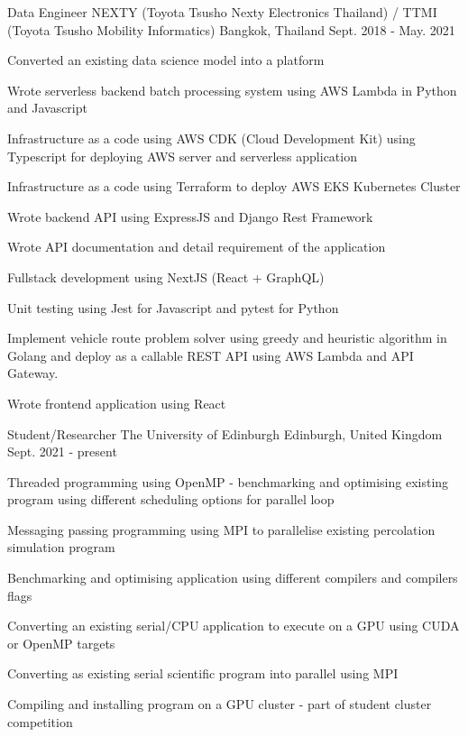\begin{cventries}
  \cventry
    {Data Engineer} %
    {NEXTY (Toyota Tsusho Nexty Electronics Thailand) / TTMI (Toyota Tsusho Mobility Informatics)} %
    {Bangkok, Thailand} %
    {Sept. 2018 - May. 2021} %
    {
      \begin{cvitems} %
        \item {Converted an existing data science model into a platform}
        \item {Wrote serverless backend batch processing system using AWS Lambda in Python and Javascript}
        \item {
          Infrastructure as a code using AWS CDK (Cloud Development Kit) using
          Typescript for deploying AWS server and serverless application
        }
        \item {
          Infrastructure as a code using Terraform to deploy AWS EKS Kubernetes Cluster 
        }
        \item {Wrote backend API using ExpressJS and Django Rest Framework}
        \item {Wrote API documentation and detail requirement of the application}
        \item {Fullstack development using NextJS (React + GraphQL)}
        \item {Unit testing using Jest for Javascript and pytest for Python}
        \item Implement vehicle route problem solver using greedy and heuristic algorithm in Golang and deploy as a callable REST API using AWS Lambda and API Gateway. 
        \item {Wrote frontend application using React}
      \end{cvitems}
    }
  \cventry
  {Student/Researcher} %
  {The University of Edinburgh} %
  {Edinburgh, United Kingdom} %
  {Sept. 2021 - present} %
  {
    \begin{cvitems} %
      \item {Threaded programming using OpenMP - benchmarking and optimising existing program using different scheduling options for parallel loop}
      \item {Messaging passing programming using MPI to parallelise existing percolation simulation program}
      \item {Benchmarking and optimising application using different compilers and compilers flags}
      \item {Converting an existing serial/CPU application to execute on a GPU using CUDA or OpenMP targets}
      \item {Converting as existing serial scientific program into parallel using MPI}
      \item {Compiling and installing program on a GPU cluster - part of student cluster competition}
    \end{cvitems}
  }
\end{cventries}
